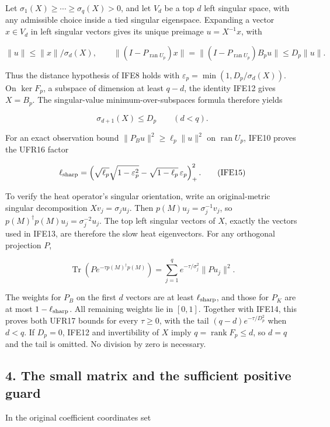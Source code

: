 \documentclass[11pt]{article}
\begin{document}
Let \(\sigma_1(X)\ge\cdots\ge\sigma_q(X)>0\), and let \(V_d\) be a top \(d\) left singular space, with any admissible choice inside a tied singular eigenspace. Expanding a vector \(x\in V_d\) in left singular vectors gives its unique preimage \(u=X^{-1}x\), with

\[
\|u\|\le\|x\|/\sigma_d(X),\qquad
\|(I-P_{\operatorname{ran}U_p})x\|
=\|(I-P_{\operatorname{ran}U_p})B_pu\|
\le D_p\|u\|.
\tag{IFE13}
\]

Thus the distance hypothesis of IFE8 holds with \(\varepsilon_p=\min(1,D_p/\sigma_d(X))\). On \(\ker F_p\), a subspace of dimension at least \(q-d\), the identity IFE12 gives \(X=B_p\). The singular-value minimum-over-subspaces formula therefore yields

\[
\sigma_{d+1}(X)\le D_p\qquad(d<q).
\tag{IFE14}
\]

For an exact observation bound \(\|P_Bu\|^2\ge\ell_p\|u\|^2\) on \(\operatorname{ran}U_p\), IFE10 proves the UFR16 factor

\[
\ell_{\rm sharp}=
\left(\sqrt{\ell_p}\sqrt{1-\varepsilon_p^2}
-\sqrt{1-\ell_p}\,\varepsilon_p\right)_+^2.
\tag{IFE15}
\]

To verify the heat operator's singular orientation, write an original-metric singular decomposition \(Xv_j=\sigma_j u_j\). Then \(p(M)u_j=\sigma_j^{-1}v_j\), so \(p(M)^\dagger p(M)u_j=\sigma_j^{-2}u_j\). The top left singular vectors of \(X\), exactly the vectors used in IFE13, are therefore the slow heat eigenvectors. For any orthogonal projection \(P\),

\[
\operatorname{Tr}(Pe^{-\tau p(M)^\dagger p(M)})
=\sum_{j=1}^q e^{-\tau/\sigma_j^2}\|Pu_j\|^2.
\tag{IFE16}
\]

The weights for \(P_B\) on the first \(d\) vectors are at least \(\ell_{\rm sharp}\), and those for \(P_K\) are at most \(1-\ell_{\rm sharp}\). All remaining weights lie in \([0,1]\). Together with IFE14, this proves both UFR17 bounds for every \(\tau\ge0\), with the tail \((q-d)e^{-\tau/D_p^2}\) when \(d<q\). If \(D_p=0\), IFE12 and invertibility of \(X\) imply \(q=\operatorname{rank}F_p\le d\), so \(d=q\) and the tail is omitted. No division by zero is necessary.

\subsection{4. The small matrix and the sufficient positive guard}\label{the-small-matrix-and-the-sufficient-positive-guard}

In the original coefficient coordinates set
\end{document}
